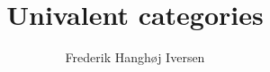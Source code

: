 \documentclass{article}
\title{Univalent categories}
\author{Frederik Hanghøj Iversen}
\begin{document}
\maketitle






\nocite{cubical-demo}
\nocite{coquand-2013}

\begin{appendices}


\end{appendices}
\end{document}
